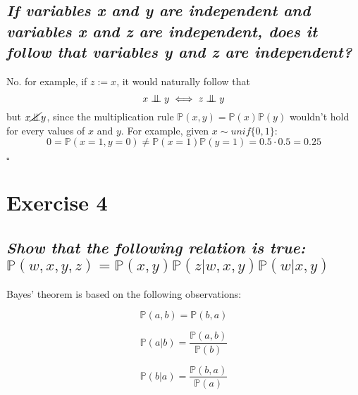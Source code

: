 \documentclass[11pt]{scrartcl} %
\begin{document}
        \subsection*{{\it If variables x and y are independent and variables x and z are independent, does it follow that variables y and z are independent?}}
        \newcommand{\CI}{\mathrel{\text{\scalebox{1.07}{$\perp\mkern-10mu\perp$}}}}
        \newcommand{\nCI}{\cancel{\mathrel{\text{\scalebox{1.07}{$\perp\mkern-10mu\perp$}}}}}
        No. for example, if \(z := x\), it would naturally follow that
        \begin{equation}
          x \CI y \iff z \CI y
        \end{equation}
        but \(x \nCI y\), since the multiplication rule \(\mathbb{P}(x,y) = \mathbb{P}(x)\mathbb{P}(y)\) wouldn't hold for every values of \(x\) and \(y\). For example, given \(x\sim unif\{0, 1\}\):
        \begin{equation}
          0 = \mathbb{P}(x=1, y=0) \neq \mathbb{P}(x=1)\mathbb{P}(y=1) = 0.5\cdot 0.5 = 0.25
        \end{equation}
        \begin{flushright}
		$\square$\\
	\end{flushright}




	\vspace{5mm}
        \section*{Exercise 4}
        \subsection*{{\it Show that the following relation is true: \(\mathbb{P}(w,x,y,z) = \mathbb{P}(x,y)\mathbb{P}(z|w, x, y)\mathbb{P}(w|x, y)\)}}
        Bayes' theorem is based on the following observations:

        \begin{equation}\label{eq:1}
          \mathbb{P}(a, b) = \mathbb{P}(b, a)
        \end{equation}

        \begin{equation}\label{eq:2}
          \mathbb{P}(a|b) = \frac{\mathbb{P}(a, b)}{\mathbb{P}(b)}
        \end{equation}

        \begin{equation}\label{eq:2}
          \mathbb{P}(b|a) = \frac{\mathbb{P}(b, a)}{\mathbb{P}(a)}
        \end{equation}
\end{document}
